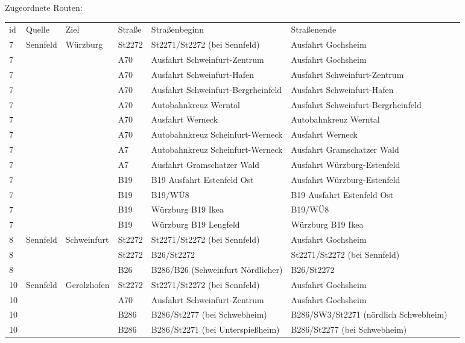 Zugeordnete Routen:
\newline
\newline
\begin{tabular}{|l|l|l|l|l|l|l|}
    \hline
    id & Quelle & Ziel & Straße & Straßenbeginn & Straßenende\\ 
    7 & Sennfeld & Würzburg & St2272 & St2271/St2272 (bei Sennfeld) & Ausfahrt Gochsheim\\ 
    7 &  &  & A70 & Ausfahrt Schweinfurt-Zentrum & Ausfahrt Gochsheim\\ 
    7 &  &  & A70 & Ausfahrt Schweinfurt-Hafen & Ausfahrt Schweinfurt-Zentrum\\ 
    7 &  &  & A70 & Ausfahrt Schweinfurt-Bergrheinfeld & Ausfahrt Schweinfurt-Hafen\\ 
    7 &  &  & A70 & Autobahnkreuz Werntal & Ausfahrt Schweinfurt-Bergrheinfeld\\ 
    7 &  &  & A70 & Ausfahrt Werneck & Autobahnkreuz Werntal\\ 
    7 &  &  & A70 & Autobahnkreuz Scheinfurt-Werneck & Ausfahrt Werneck\\ 
    7 &  &  & A7 & Autobahnkreuz Scheinfurt-Werneck & Ausfahrt Gramschatzer Wald\\ 
    7 &  &  & A7 & Ausfahrt Gramschatzer Wald & Ausfahrt Würzburg-Estenfeld\\ 
    7 &  &  & B19 & B19 Ausfahrt Estenfeld Ost & Ausfahrt Würzburg-Estenfeld\\ 
    7 &  &  & B19 & B19/WÜ8 & B19 Ausfahrt Estenfeld Ost\\ 
    7 &  &  & B19 & Würzburg B19 Ikea & B19/WÜ8\\ 
    7 &  &  & B19 & Würzburg B19 Lengfeld & Würzburg B19 Ikea\\ 
    \hline
    8 & Sennfeld & Schweinfurt & St2272 & St2271/St2272 (bei Sennfeld) & Ausfahrt Gochsheim\\ 
    8 &  &  & St2272 & B26/St2272 & St2271/St2272 (bei Sennfeld)\\ 
    8 &  &  & B26 & B286/B26 (Schweinfurt Nördlicher) & B26/St2272\\ 
    \hline
    10 & Sennfeld & Gerolzhofen & St2272 & St2271/St2272 (bei Sennfeld) & Ausfahrt Gochsheim\\ 
    10 &  &  & A70 & Ausfahrt Schweinfurt-Zentrum & Ausfahrt Gochsheim\\ 
    10 &  &  & B286 & B286/St2277 (bei Schwebheim) & B286/SW3/St2271 (nördlich Schwebheim)\\ 
    10 &  &  & B286 & B286/St2271 (bei Unterspießheim) & B286/St2277 (bei Schwebheim)\\ 

\end{tabular}
